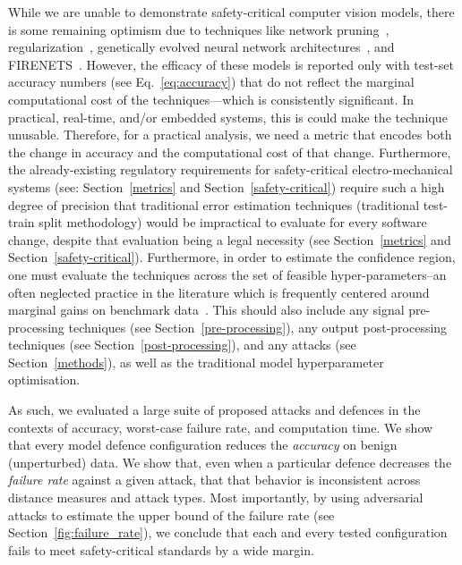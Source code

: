 While we are unable to demonstrate safety-critical computer vision models, there is some remaining optimism due to techniques like network pruning~\cite{sehwag2019towards,cosentino2019search,jian2022pruning}, regularization~\cite{ross2018improving,jakubovitz2018improving}, genetically evolved neural network architectures~\cite{sinn2019evolutionary}, and FIRENETS~\cite{colbrook2021can}.
However, the efficacy of these models is reported only with test-set accuracy numbers (see Eq.~\ref{eq:accuracy}) that do not reflect the marginal computational cost of the techniques---which is consistently significant.
In practical, real-time, and/or embedded systems, this is could make the technique unusable.
Therefore, for a practical analysis, we need a metric that encodes both the change in accuracy and the computational cost of that change.
Furthermore, the already-existing regulatory requirements for safety-critical electro-mechanical systems (see: Section~\ref{metrics} and Section~\ref{safety-critical}) require such a high degree of precision that traditional error estimation techniques (\eg traditional test-train split methodology) would be impractical to evaluate for every software change, despite that evaluation being a legal necessity (see Section~\ref{metrics} and Section~\ref{safety-critical}).
Furthermore, in order to estimate the confidence region, one must evaluate the techniques across the set of feasible hyper-parameters--an often neglected practice in the literature which is frequently centered around marginal gains on benchmark data~\cite{desislavov2021compute}.
This should also include any signal pre-processing techniques (see Section~\ref{pre-processing}), any output post-processing techniques (see Section~\ref{post-processing}), and any attacks (see Section~\ref{methods}), as well as the traditional model hyperparameter optimisation.

As such, we evaluated a large suite of proposed attacks and defences in the contexts of accuracy, worst-case failure rate, and computation time.
We show that every model defence configuration reduces the \textit{accuracy} on benign (unperturbed) data.
We show that, even when a particular defence decreases the \textit{failure rate} against a given attack, that that behavior is inconsistent across distance measures and attack types.
Most importantly, by using adversarial attacks to estimate the upper bound of the failure rate (see Section~\ref{fig:failure_rate}), we conclude that each and every tested configuration fails to meet safety-critical standards by a wide margin.

